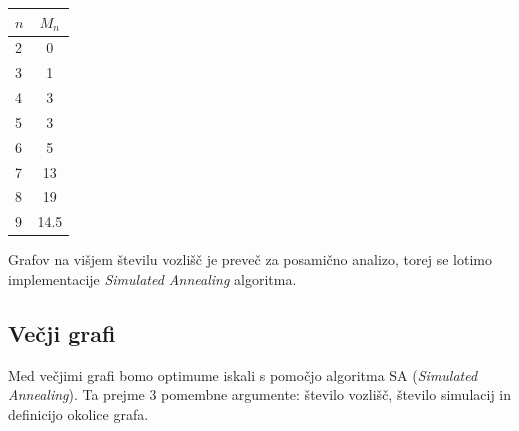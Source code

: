 \documentclass[ letterpaper, titlepage, fleqn]{article}
\begin{document}
\begin{center}
    \begin{tabular}{ l | c }
      $n$ & $M_n$ \\ \hline
      2 & 0 \\ 
      3 & 1 \\ 
      4 & 3 \\ 
      5 & 3 \\ 
      6 & 5 \\ 
      7 & 13 \\ 
      8 & 19 \\ 
      9 & 14.5 \\ 
    \end{tabular}
\end{center}

Grafov na višjem številu vozlišč je preveč za posamično analizo, torej
se lotimo implementacije {\em Simulated Annealing} algoritma.

\subsection{Večji grafi}

Med večjimi grafi bomo optimume iskali s pomočjo algoritma SA ({\em Simulated Annealing}). 
Ta prejme 3 pomembne argumente: število vozlišč, število simulacij in definicijo okolice grafa.
\end{document}

